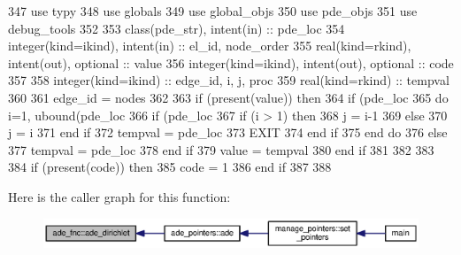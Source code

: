 \begin{DoxyCode}
347       \textcolor{keywordtype}{use }typy
348       \textcolor{keywordtype}{use }globals
349       \textcolor{keywordtype}{use }global_objs
350       \textcolor{keywordtype}{use }pde_objs
351       \textcolor{keywordtype}{use }debug_tools
352       
353       \textcolor{keywordtype}{class}(pde_str), \textcolor{keywordtype}{intent(in)} :: pde\_loc
354       \textcolor{keywordtype}{integer(kind=ikind)}, \textcolor{keywordtype}{intent(in)}  :: el\_id, node\_order
355       \textcolor{keywordtype}{real(kind=rkind)}, \textcolor{keywordtype}{intent(out)}, \textcolor{keywordtype}{optional}    :: value
356       \textcolor{keywordtype}{integer(kind=ikind)}, \textcolor{keywordtype}{intent(out)}, \textcolor{keywordtype}{optional} :: code
357       
358       \textcolor{keywordtype}{integer(kind=ikind)} :: edge\_id, i, j, proc
359       \textcolor{keywordtype}{real(kind=rkind)} :: tempval
360       
361       edge\_id = nodes%
362       
363       \textcolor{keywordflow}{if} (\textcolor{keyword}{present}(\textcolor{keywordtype}{value})) \textcolor{keywordflow}{then}
364         \textcolor{keywordflow}{if} (pde\_loc%
365           \textcolor{keywordflow}{do} i=1, ubound(pde\_loc%
366             \textcolor{keywordflow}{if} (pde\_loc%
367               \textcolor{keywordflow}{if} (i > 1) \textcolor{keywordflow}{then}
368                 j = i-1
369               \textcolor{keywordflow}{else}
370                 j = i
371 \textcolor{keywordflow}{              end if}
372               tempval = pde\_loc%
373               \textcolor{keywordflow}{EXIT}
374 \textcolor{keywordflow}{            end if}
375 \textcolor{keywordflow}{          end do}
376         \textcolor{keywordflow}{else}
377           tempval =  pde\_loc%
378 \textcolor{keywordflow}{        end if}
379         \textcolor{keywordtype}{value} = tempval 
380 \textcolor{keywordflow}{      end if}
381 
382 
383       
384       \textcolor{keywordflow}{if} (\textcolor{keyword}{present}(code)) \textcolor{keywordflow}{then}
385         code = 1
386 \textcolor{keywordflow}{      end if}
387       
388 
\end{DoxyCode}


Here is the caller graph for this function\+:\nopagebreak
\begin{figure}[H]
\begin{center}
\leavevmode
\includegraphics[width=350pt]{namespaceade__fnc_a5b91d20870b339e174fbd7c2e8bec184_icgraph}
\end{center}
\end{figure}


